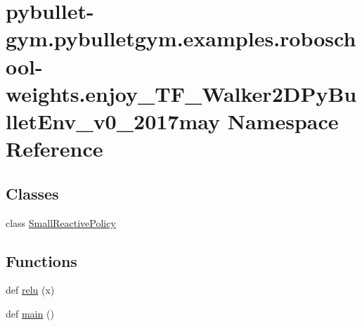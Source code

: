 \hypertarget{namespacepybullet-gym_1_1pybulletgym_1_1examples_1_1roboschool-weights_1_1enjoy___t_f___walker2_d_py_bullet_env__v0__2017may}{}\section{pybullet-\/gym.pybulletgym.\+examples.\+roboschool-\/weights.enjoy\+\_\+\+T\+F\+\_\+\+Walker2\+D\+Py\+Bullet\+Env\+\_\+v0\+\_\+2017may Namespace Reference}
\label{namespacepybullet-gym_1_1pybulletgym_1_1examples_1_1roboschool-weights_1_1enjoy___t_f___walker2_d_py_bullet_env__v0__2017may}
\subsection*{Classes}
\begin{DoxyCompactItemize}
\item 
class \hyperlink{classpybullet-gym_1_1pybulletgym_1_1examples_1_1roboschool-weights_1_1enjoy___t_f___walker2_d_py67c66ce9af046719f71fa52f34f6de01}{Small\+Reactive\+Policy}
\end{DoxyCompactItemize}
\subsection*{Functions}
\begin{DoxyCompactItemize}
\item 
def \hyperlink{namespacepybullet-gym_1_1pybulletgym_1_1examples_1_1roboschool-weights_1_1enjoy___t_f___walker2_d_py_bullet_env__v0__2017may_ac806796d7bc537fc3f5aa7379e7df815}{relu} (x)
\item 
def \hyperlink{namespacepybullet-gym_1_1pybulletgym_1_1examples_1_1roboschool-weights_1_1enjoy___t_f___walker2_d_py_bullet_env__v0__2017may_a5ad4dbdc60a94b172da560ceb6488c9e}{main} ()
\end{DoxyCompactItemize}
